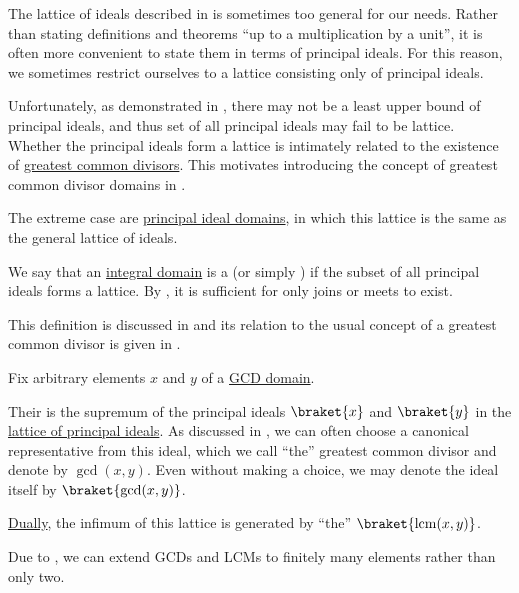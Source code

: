 \begin{remark}\label{rem:lattice_of_principal_ideals}
  The lattice of ideals described in  is sometimes too general for our needs. Rather than stating definitions and theorems \enquote{up to a multiplication by a unit}, it is often more convenient to state them in terms of principal ideals. For this reason, we sometimes restrict ourselves to a lattice consisting only of principal ideals.

  Unfortunately, as demonstrated in , there may not be a least upper bound of principal ideals, and thus set of all principal ideals may fail to be lattice. Whether the principal ideals form a lattice is intimately related to the existence of \hyperref[def:gcd_and_lcm]{greatest common divisors}. This motivates introducing the concept of greatest common divisor domains in .

  The extreme case are \hyperref[def:principal_ideal_domain]{principal ideal domains}, in which this lattice is the same as the general lattice of ideals.
\end{remark}

\begin{definition}\label{def:gcd_domain}\mimprovised
  We say that an \hyperref[def:integral_domain]{integral domain} is a  (or simply ) if the subset of all principal ideals forms a lattice. By , it is sufficient for only joins or meets to exist.

  This definition is discussed in  and its relation to the usual concept of a greatest common divisor is given in .
\end{definition}

\begin{definition}\label{def:gcd_and_lcm}\mimprovised
  Fix arbitrary elements \( x \) and \( y \) of a \hyperref[def:gcd_domain]{GCD domain}.

  Their  is the supremum of the principal ideals \( \braket{ x } \) and \( \braket{ y } \) in the \hyperref[rem:lattice_of_principal_ideals]{lattice of principal ideals}. As discussed in , we can often choose a canonical representative from this ideal, which we call \enquote{the} greatest common divisor and denote by \( \gcd(x, y) \). Even without making a choice, we may denote the ideal itself by \( \braket{ \gcd(x, y) } \).

  \hyperref[def:semilattice/duality]{Dually}, the infimum of this lattice is generated by \enquote{the}  \( \braket{ \lcm(x, y) } \).

  Due to , we can extend GCDs and LCMs to finitely many elements rather than only two.
\end{definition}

